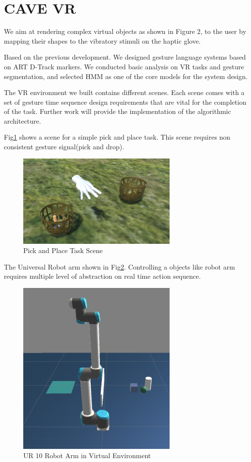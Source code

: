 \section{CAVE VR}

We aim at rendering complex virtual objects as shown in Figure 2, to
the user by mapping their shapes to the vibratory stimuli on the
haptic glove.

Based on the previous development. We designed gesture language
systems based on ART D-Track markers. %
We conducted basic analysis on VR tasks and gesture segmentation, and
selected HMM as one of the core models for the system
design. 


The VR environment we built contains different
scenes. Each scene comes with  a set of gesture time sequence design
requirements that are vital for the completion of the task. Further
work will provide the implementation of the algorithmic architecture.  

Fig\ref{fig:pickplace} shows a scene for a simple pick and
place task. This scene requires non consistent gesture signal(pick and
drop). 

\begin{figure}[!ht]
  \centering
  \includegraphics[width=8cm]{figures/pickplace.png}
  \caption{Pick and Place Task Scene}
  \label{fig:pickplace}
\end{figure}

The Universal Robot arm shown in Fig\ref{fig:ur10}. Controlling a
objects like robot arm requires multiple level of abstraction on real
time action sequence.

\begin{figure}[!ht]
  \centering
  \includegraphics[width=8cm]{figures/ur10.png}
  \caption{UR 10 Robot Arm in Virtual Environment}
  \label{fig:ur10}
\end{figure}
